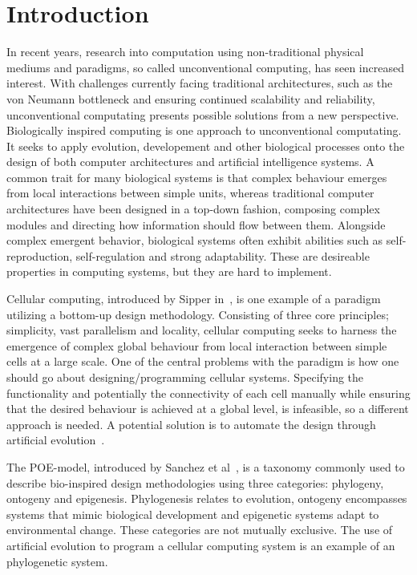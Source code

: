 
\setcounter{page}{1}
\chapter{Introduction}

In recent years, research into computation using non-traditional physical
mediums and paradigms, so called unconventional computing, has seen increased
interest. With challenges currently facing traditional architectures, such as
the von Neumann bottleneck and ensuring continued scalability and reliability,
unconventional computating presents possible solutions from a new perspective.
Biologically inspired computing is one approach to unconventional computating.
It seeks to apply evolution, developement and other biological processes onto
the design of both computer architectures and artificial intelligence systems. A
common trait for many biological systems is that complex behaviour emerges from
local interactions between simple units, whereas traditional computer
architectures have been designed in a top-down fashion, composing complex
modules and directing how information should flow between them. Alongside
complex emergent behavior, biological systems often exhibit abilities such as
self-reproduction, self-regulation and strong adaptability. These are desireable
properties in computing systems, but they are hard to implement.

Cellular computing, introduced by Sipper in~\cite{Sipper1999}, is one example of
a paradigm utilizing a bottom-up design methodology. Consisting of three core
principles; simplicity, vast parallelism and locality, cellular computing seeks
to harness the emergence of complex global behaviour from local interaction
between simple cells at a large scale. One of the central problems with the
paradigm is how one should go about designing/programming cellular systems.
Specifying the functionality and potentially the connectivity of each cell
manually while ensuring that the desired behaviour is achieved at a global
level, is infeasible, so a different approach is needed. A potential solution is
to automate the design through artificial evolution~\cite{Sipper2004}.

The POE-model, introduced by Sanchez et al~\cite{Sanchez1997}, is a taxonomy
commonly used to describe bio-inspired design methodologies using three categories:
phylogeny, ontogeny and epigenesis. Phylogenesis relates to evolution, ontogeny
encompasses systems that mimic biological development and epigenetic systems
adapt to environmental change. These categories are not mutually exclusive. The
use of artificial evolution to program a cellular computing system is an example
of an phylogenetic system.


